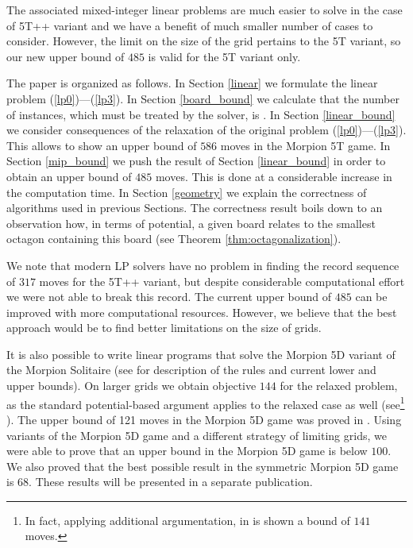 The associated mixed-integer linear problems are much easier to solve in the case of 5T++ variant and we have a benefit of much smaller number of cases to consider. However, the limit on the size of the grid pertains to the 5T variant, so our new upper bound of $485$ is valid for the 5T variant only.

The paper is organized as follows. In Section \ref{linear} we formulate the linear problem (\ref{lp0})---(\ref{lp3}). In Section \ref{board_bound} we calculate that the number of instances, which must be treated by the solver, is \theoctagons. In Section \ref{linear_bound} we consider consequences of the relaxation of the original problem (\ref{lp0})---(\ref{lp3}). This allows to show an upper bound of $586$ moves in the Morpion 5T game. In Section \ref{mip_bound} we push the result of Section \ref{linear_bound} in order to obtain an upper bound of $485$ moves. This is done at a considerable increase in the computation time. In Section \ref{geometry} we explain the correctness of algorithms used in previous Sections. The correctness result boils down to an observation how, in terms of potential, a given board relates to the smallest octagon containing this board (see Theorem \ref{thm:octagonalization}). 

We note that modern LP solvers have no problem in finding the record sequence of $317$ moves for the 5T++ variant, but despite considerable computational effort we were not able to break this record. %
The current upper bound of $485$ can be improved with more computational resources. However, we believe that the best approach would be to find better limitations on the size of grids. %

It is also possible to write linear programs that solve the Morpion 5D variant of the Morpion Solitaire (see \cite{boyer} for description of the rules and current lower and upper bounds). On larger grids we obtain objective $144$ for the relaxed problem, as the standard potential-based argument applies to the relaxed case as well (see\footnote{In fact, applying additional argumentation, in \cite{demaine} is shown a bound of $141$ moves.} \cite{demaine}). The upper bound of 121 moves in the Morpion 5D game was proved in \cite{japonczycy}. Using variants of the Morpion 5D game and a different strategy of limiting grids, we were able to prove that an upper bound in the Morpion 5D game is below $100$. We also proved that the best possible result in the symmetric Morpion 5D game is $68$. These results will be presented in a separate publication. %
